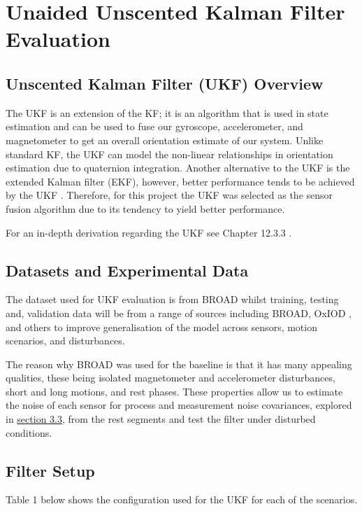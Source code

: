 \newpage
\section{Unaided Unscented Kalman Filter Evaluation}

\subsection{Unscented Kalman Filter (UKF) Overview}
The UKF is an extension of the KF; it is an algorithm that is used in state estimation and
can be used to fuse our gyroscope, accelerometer, and magnetometer to get an overall orientation
estimate of our system. Unlike standard KF, the UKF can model the non-linear relationships
in orientation estimation due to quaternion integration. Another alternative to the UKF is the extended Kalman filter (EKF), 
however, better performance tends to be achieved by the UKF \cite{kraft_2003_a}. Therefore, for this 
project the UKF was selected as the sensor fusion algorithm due to its tendency to yield 
better performance. 

For an in-depth derivation regarding the UKF see Chapter 12.3.3 \cite{yang_2014_body}.

\subsection{Datasets and Experimental Data}
The dataset used for UKF evaluation is from BROAD \cite{laidig_2021_broada} whilst training, testing and, validation data will be from a range of sources
including BROAD, OxIOD \cite{a2019_dataset}, and others to improve 
generalisation of the model across sensors, motion scenarios, and disturbances. 

The reason why BROAD
was used for the baseline is that it has many appealing qualities, these 
being isolated magnetometer and accelerometer disturbances, short and long motions, and rest phases.
These properties allow us to estimate the noise of each sensor for process and measurement noise 
covariances, explored in \hyperref[sec:filtersetup]{section 3.3},  from the rest segments and test the
filter under disturbed conditions.



\subsection{Filter Setup}

Table 1 below shows the configuration used for the UKF for each of the scenarios. 

